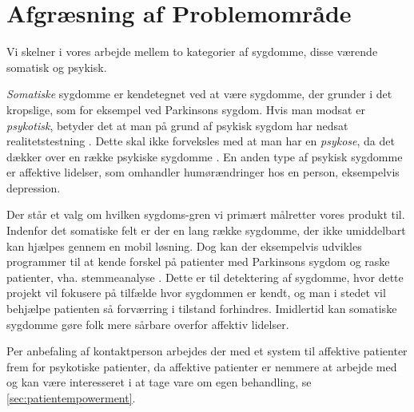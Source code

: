 \section{Afgræsning af Problemområde}
Vi skelner i vores arbejde mellem to kategorier af sygdomme, disse værende somatisk og psykisk.

\textit{Somatiske} sygdomme er kendetegnet ved at være sygdomme, der grunder i det kropslige, som for eksempel ved Parkinsons sygdom.
Hvis man modsat er \textit{psykotisk}, betyder det at man på grund af psykisk sygdom har nedsat realitetstestning \citep{misc:netpsykpsykose}.
Dette skal ikke forveksles med at man har en \textit{psykose}, da det dækker over en række psykiske sygdomme \citep{misc:netpsykpsykose}.
En anden type af psykisk sygdomme er affektive lidelser, som omhandler humørændringer hos en person, eksempelvis depression.

Der står et valg om hvilken sygdoms-gren vi primært målretter vores produkt til.
Indenfor det somatiske felt er der en lang række sygdomme, der ikke umiddelbart kan hjælpes gennem en mobil løsning.
Dog kan der eksempelvis udvikles programmer til at kende forskel på patienter med Parkinsons sygdom og raske patienter, vha. stemmeanalyse \citep{6168572}.
Dette er til detektering af sygdomme, hvor dette projekt vil fokusere på tilfælde hvor sygdommen er kendt, og man i stedet vil behjælpe patienten så forværring i tilstand forhindres.
Imidlertid kan somatiske sygdomme gøre folk mere sårbare overfor affektiv lidelser.

Per anbefaling af kontaktperson \citet{misc:janne-rasmussen} arbejdes der med et system til affektive patienter frem for psykotiske patienter, da affektive patienter er nemmere at arbejde med og kan være interesseret i at tage vare om egen behandling, se \cref{sec:patientempowerment}.